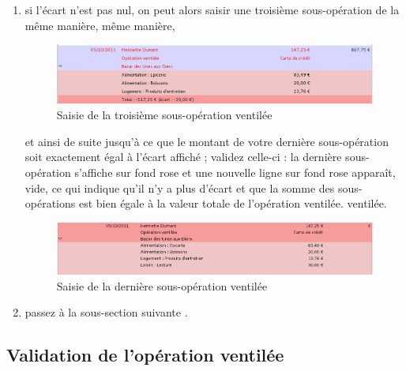 \begin{enumerate}
	 \item  si l'écart n'est pas nul, on peut alors saisir une troisième sous-opération de la \ifIllustration même manière,
	\else même manière,
	\fi
	\ifIllustration
	\begin{figure}[htp]
	\begin{center}
	\includegraphics[scale=0.5]{image/screenshot/transactions_breakdown_sub3}
	\end{center}
	\caption{Saisie de la troisième sous-opération ventilée}
	\label{transactions-breakdown-sub3-img}
	\end{figure}
	\fi
	et ainsi de suite jusqu'à ce que le montant de votre dernière sous-opération soit exactement égal à l'écart affiché ; validez celle-ci : la dernière sous-opération s'affiche sur fond rose{\couleur} et une nouvelle ligne sur fond rose{\couleur} apparaît, vide, ce qui indique qu'il n'y a plus d'écart et que la somme des sous-opérations est bien égale à la valeur totale de l'opération \ifIllustration  ventilée.
	\else ventilée.
	\fi
	
	\ifIllustration
	\begin{figure}[htp]
	\begin{center}
	\includegraphics[scale=0.5]{image/screenshot/transactions_breakdown_complete}
	\end{center}
	\caption{Saisie de la dernière sous-opération ventilée}
	\label{transactions-breakdown-complete-img}
	\end{figure}
	\fi
	 
		 \item passez à la sous-section suivante .
\end{enumerate}


\subsection{Validation de l'opération ventilée\label{transactions-breakdown-validation}}


